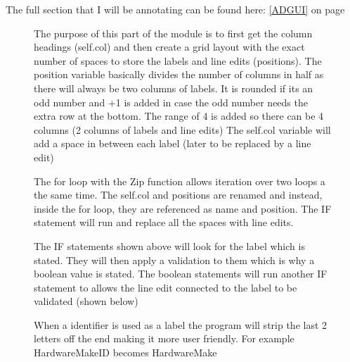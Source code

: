 The full section that I will be annotating can be found here: \ref{ADGUI} on page \pageref{ADGUI}
\begin{landscape}

\begin{figure}[H]
    \caption{The purpose of this part of the module is to first get the column headings (self.col) and then create a grid layout with the exact number of spaces to store the labels and line edits (positions). The position variable basically divides the number of columns in half as there will always be two columns of labels. It is rounded if its an odd number and +1 is added in case the odd number needs the extra row at the bottom. The range of 4 is added so there can be 4 columns (2 columns of labels and line edits) \newline The self.col variable will add a space in between each label (later to be replaced by a line edit)}  
\end{figure}

\begin{figure}[H]
    \caption{The for loop with the Zip function allows iteration over two loops a the same time. The self.col and positions are renamed and instead, inside the for loop, they are referenced as name and position. \newline The IF statement will run and replace all the spaces with line edits.}  
\end{figure}

\begin{figure}[H]
    \caption{The IF statements shown above will look for the label which is stated. They will then apply a validation to them which is why a boolean value is stated. The boolean statements will run another IF statement to allows the line edit connected to the label to be validated (shown below)}  
\end{figure}


\begin{figure}[H]
    \caption{When a identifier is used as a label the program will strip the last 2 letters off the end making it more user friendly. For example HardwareMakeID becomes HardwareMake}  
\end{figure}



\end{landscape}

